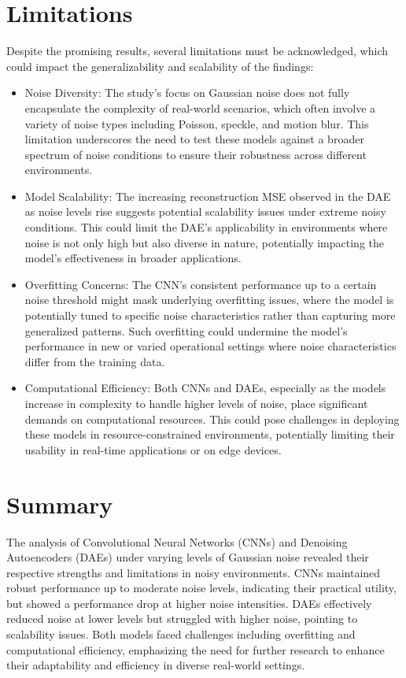 \section{Limitations} 
Despite the promising results, several limitations must be acknowledged, which could impact the generalizability and scalability of the findings:


\begin{itemize}[label=$\bullet$]
    \item Noise Diversity: The study's focus on Gaussian noise does not fully encapsulate the complexity of real-world scenarios, which often involve a variety of noise types including Poisson, speckle, and motion blur. This limitation underscores the need to test these models against a broader spectrum of noise conditions to ensure their robustness across different environments.

    \item Model Scalability: The increasing reconstruction MSE observed in the DAE as noise levels rise suggests potential scalability issues under extreme noisy conditions. This could limit the DAE's applicability in environments where noise is not only high but also diverse in nature, potentially impacting the model’s effectiveness in broader applications.

    \item Overfitting Concerns: The CNN's consistent performance up to a certain noise threshold might mask underlying overfitting issues, where the model is potentially tuned to specific noise characteristics rather than capturing more generalized patterns. Such overfitting could undermine the model’s performance in new or varied operational settings where noise characteristics differ from the training data.

    \item Computational Efficiency: Both CNNs and DAEs, especially as the models increase in complexity to handle higher levels of noise, place significant demands on computational resources. This could pose challenges in deploying these models in resource-constrained environments, potentially limiting their usability in real-time applications or on edge devices.

\end{itemize}


\section{Summary}
The analysis of Convolutional Neural Networks (CNNs) and Denoising Autoencoders (DAEs) under varying levels of Gaussian noise revealed their respective strengths and limitations in noisy environments. CNNs maintained robust performance up to moderate noise levels, indicating their practical utility, but showed a performance drop at higher noise intensities. DAEs effectively reduced noise at lower levels but struggled with higher noise, pointing to scalability issues. Both models faced challenges including overfitting and computational efficiency, emphasizing the need for further research to enhance their adaptability and efficiency in diverse real-world settings.